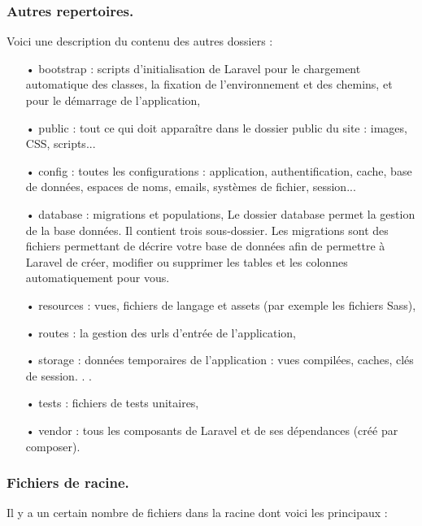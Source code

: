 \documentclass[12pt,a4paper]{article}
\begin{document}
\subsubsection{Autres repertoires.}
Voici une description du contenu des autres dossiers :
\begin{itemize}
\item[•] bootstrap : scripts d'initialisation de Laravel pour le chargement automatique des classes, la fixation de l'environnement et des chemins, et pour le démarrage de l'application,
\item[•] public : tout ce qui doit apparaître dans le dossier public du site : images, CSS, scripts...
\item[•] config : toutes les configurations : application, authentification, cache, base de données, espaces
de noms, emails, systèmes de fichier, session...
\item[•] database : migrations et populations,
Le dossier database permet la gestion de la base données. Il contient trois sous-dossier.
Les migrations sont des fichiers permettant de décrire votre base de données afin de permettre
à Laravel de créer, modifier ou supprimer les tables et les colonnes automatiquement pour vous.
\item[•] resources : vues, fichiers de langage et assets (par exemple les fichiers Sass),
\item[•] routes : la gestion des urls d'entrée de l'application,
\item[•] storage : données temporaires de l'application : vues compilées, caches, clés de session. . .
\item[•] tests : fichiers de tests unitaires,
\item[•] vendor : tous les composants de Laravel et de ses dépendances (créé par composer).
\end{itemize}

\subsubsection{Fichiers de racine.}
Il y a un certain nombre de fichiers dans la racine dont voici les principaux :
\end{document}
